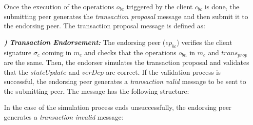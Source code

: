 \documentclass[conference]{llncs}
\newcounter{paranum}
\newcommand{\Par}{\vspace{10pt}\noindent\textbf{\refstepcounter{paranum}\theparanum}\textbf\textit) }
\begin{document}
Once the execution of the operations $o_{bc}$ triggered by the client
$c_{bc}$ is done, the submitting peer generates the
\textit{transaction proposal} message and then submit it to the
endorsing peer. The transaction proposal message is defined as:

\noindent{}

\Par{\textit{\textbf{Transaction Endorsement:}}} The endorsing peer ($ep_{bc}$) verifies the client signature $\sigma_c$ coming in $m_c$ and checks that the operations $o_{bn}$ in $m_c$ and $trans_{prop}$ are the same. Then, the endorser simulates the transaction proposal and validates that the $stateUpdate$ and $verDep$ are correct. If the validation process is successful, the endorsing peer generates a \textit{transaction valid} message to be sent to the submitting peer. The message has the following structure: ~\\

\noindent{}

In the case of the simulation process ends unsuccessfully, the endorsing peer generates a \textit{transaction invalid} message: ~\\

\noindent{}
\end{document}
